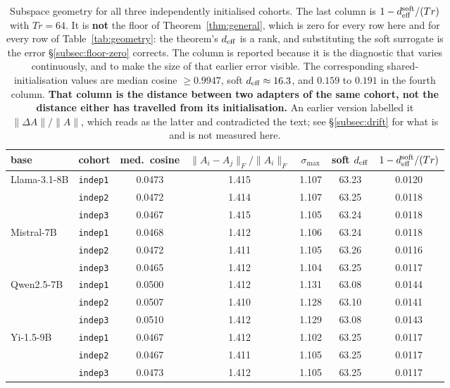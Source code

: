 \begin{table}[tb]
\centering
\small
\caption{Subspace geometry for all three independently initialised
cohorts. The last column is $1 - d_{\mathrm{eff}}^{\mathrm{soft}}/(Tr)$ with
$Tr = 64$. It is \textbf{not} the floor of
Theorem~\ref{thm:general}, which is zero for every row here and for every
row of Table~\ref{tab:geometry}: the theorem's $d_{\mathrm{eff}}$ is a rank, and
substituting the soft surrogate is the error \S\ref{subsec:floor-zero}
corrects. The column is reported because it is the diagnostic that varies
continuously, and to make the size of that earlier error visible. The
corresponding shared-initialisation values are median cosine
$\geq 0.9947$, soft $d_{\mathrm{eff}} \approx 16.3$, and $0.159$ to $0.191$ in the
fourth column.
\textbf{That column is the distance between two adapters of the same cohort,
not the distance either has travelled from its initialisation.} An earlier
version labelled it $\|\Delta A\|/\|A\|$, which reads as the latter and
contradicted the text; see \S\ref{subsec:drift} for what is and is not
measured here.}
\label{tab:geometry-all}
\begin{tabular}{llccccc}
\toprule
base & cohort & med.\ cosine & $\|A_i - A_j\|_F/\|A_i\|_F$ & $\sigma_{\max}$ &
soft $d_{\mathrm{eff}}$ & $1 - d_{\mathrm{eff}}^{\mathrm{soft}}/(Tr)$ \\
\midrule
Llama-3.1-8B & \texttt{indep1} & 0.0473 & 1.415 & 1.107 & 63.23 & 0.0120 \\
             & \texttt{indep2} & 0.0472 & 1.414 & 1.107 & 63.25 & 0.0118 \\
             & \texttt{indep3} & 0.0467 & 1.415 & 1.105 & 63.24 & 0.0118 \\
\addlinespace
Mistral-7B   & \texttt{indep1} & 0.0468 & 1.412 & 1.106 & 63.24 & 0.0118 \\
             & \texttt{indep2} & 0.0472 & 1.411 & 1.105 & 63.26 & 0.0116 \\
             & \texttt{indep3} & 0.0465 & 1.412 & 1.104 & 63.25 & 0.0117 \\
\addlinespace
Qwen2.5-7B   & \texttt{indep1} & 0.0500 & 1.412 & 1.131 & 63.08 & 0.0144 \\
             & \texttt{indep2} & 0.0507 & 1.410 & 1.128 & 63.10 & 0.0141 \\
             & \texttt{indep3} & 0.0510 & 1.412 & 1.129 & 63.08 & 0.0143 \\
\addlinespace
Yi-1.5-9B    & \texttt{indep1} & 0.0467 & 1.412 & 1.102 & 63.25 & 0.0117 \\
             & \texttt{indep2} & 0.0467 & 1.411 & 1.105 & 63.25 & 0.0117 \\
             & \texttt{indep3} & 0.0473 & 1.412 & 1.105 & 63.25 & 0.0117 \\
\bottomrule
\end{tabular}
\end{table}

